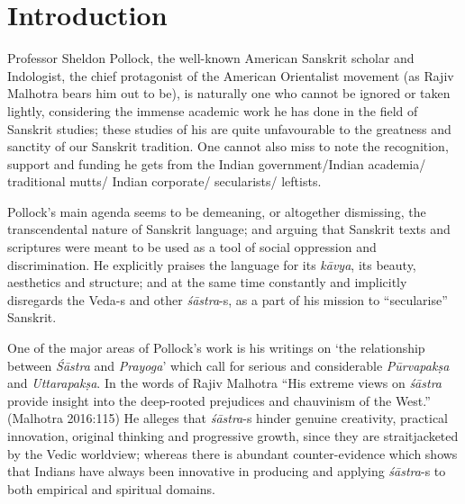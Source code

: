 \vskip -12pt

\section*{Introduction}

Professor Sheldon Pollock, the well-known American Sanskrit scholar and Indologist, the chief protagonist of the American Orientalist movement (as Rajiv Malhotra bears him out to be), is naturally one who cannot be ignored or taken lightly, considering the immense academic work he has done in the field of Sanskrit studies; these studies of his are quite unfavourable to the greatness and sanctity of our Sanskrit tradition. One cannot also miss to note the recognition, support and funding he gets from the Indian government/Indian academia/ traditional mutts/ Indian corporate/ secularists/ leftists.

Pollock's main agenda seems to be demeaning, or altogether dismissing, the transcendental nature of Sanskrit language; and arguing that Sanskrit texts and scriptures were meant to be used as a tool of social oppression and discrimination. He explicitly praises the language for its {\sl kāvya}, its beauty, aesthetics and structure; and at the same time constantly and implicitly disregards the Veda-s and other {\sl śāstra}-s, as a part of his mission to ``secularise'' Sanskrit. 

One of the major areas of Pollock's work is his writings on `the relationship between {\sl Śāstra} and {\sl Prayoga}' which call for serious and considerable {\sl Pūrvapakṣa} and {\sl Uttarapakṣa}. In the words of Rajiv Malhotra ``His extreme views on {\sl śāstra} provide insight into the deep-rooted prejudices and chauvinism of the West.'' (Malhotra 2016:115) He alleges that {\sl śāstra}-s hinder genuine creativity, practical innovation, original thinking and progressive growth, since they are straitjacketed by the Vedic worldview; whereas there is abundant counter-evidence which shows that Indians have always been innovative in producing and applying {\sl śāstra}-s to both empirical and spiritual domains.

